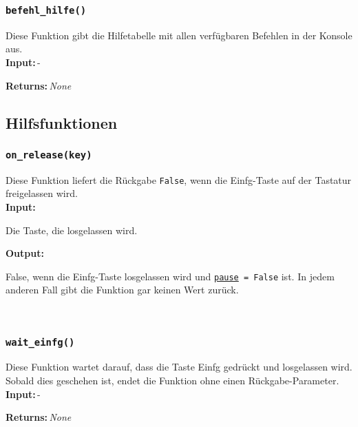 \documentclass{article}
\newcommand{\initem}[2]{\item[\hspace{0.5em} {\normalfont\ttfamily{#1}} {\normalfont\itshape{(#2)}}]}
\newcommand{\bfpara}[1]{\noindent \textbf{#1:}\,}
\begin{document}
\subsubsection*{\texttt{befehl\_hilfe()}}
Diese Funktion gibt die Hilfetabelle mit allen verf\"ugbaren Befehlen in der Konsole aus.\\

\bfpara{Input}-

\bfpara{Returns}\textit{None}\\[22pt]


\subsection{Hilfsfunktionen}

\subsubsection*{\texttt{on\_release(key)}}\label{subsubsec:on_release}
Diese Funktion liefert die R\"uckgabe \texttt{False}, wenn die Einfg-Taste auf der Tastatur freigelassen wird.\\

\bfpara{Input}
\begin{compactdesc}
	\initem{key}{pynput.keyboard.Key} Die Taste, die losgelassen wird.
\end{compactdesc}
\bfpara{Output}
\begin{compactdesc}
	\initem{}{bool} False, wenn die Einfg-Taste losgelassen wird und \hyperref[subsec:globale_variablen]{\texttt{pause}}\texttt{ = False} ist. In jedem anderen Fall gibt die Funktion gar keinen Wert zur\"uck.
\end{compactdesc}
\leavevmode\\[11pt]

\subsubsection*{\texttt{wait\_einfg()}}\label{subsubsec:wait_einfg}
Diese Funktion \glqq wartet\grqq{} darauf, dass die Taste Einfg gedr\"uckt und losgelassen wird. Sobald dies geschehen ist, endet die Funktion ohne einen R\"uckgabe-Parameter.\\

\bfpara{Input}-

\bfpara{Returns}\textit{None}\\
\end{document}

